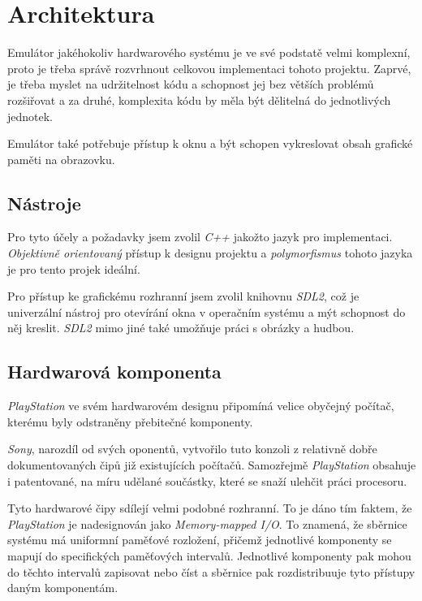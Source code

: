 \chapter{Architektura}

Emulátor jakéhokoliv hardwarového systému je ve své podstatě velmi komplexní,
proto je třeba správě rozvrhnout celkovou implementaci tohoto projektu. 
Zaprvé, je třeba myslet na udržitelnost kódu a schopnost jej bez větších problémů rozšiřovat a
za druhé, komplexita kódu by měla být dělitelná do jednotlivých jednotek.

Emulátor také potřebuje přístup k oknu a být schopen vykreslovat obsah grafické paměti
na obrazovku.

\section{Nástroje}

Pro tyto účely a požadavky jsem zvolil \textit{C++} jakožto jazyk pro implementaci.
\textit{Objektivně orientovaný} přístup k designu projektu a \textit{polymorfismus} tohoto jazyka
je pro tento projek ideální.

Pro přístup ke grafickému rozhranní jsem zvolil knihovnu \textit{SDL2}, což je univerzální
nástroj pro otevírání okna v operačním systému a mýt schopnost do něj kreslit.
\textit{SDL2} mimo jiné také umožňuje práci s obrázky a hudbou.

\section{Hardwarová komponenta}

\textit{PlayStation} ve svém hardwarovém designu připomíná velice obyčejný počítač, kterému byly
odstraněny přebitečné komponenty.

\textit{Sony}, narozdíl od svých oponentů, vytvořilo tuto konzoli z relativně dobře 
dokumentovaných čipů již existujících počítačů. Samozřejmě \textit{PlayStation} obsahuje i
patentované, na míru udělané součástky, které se snaží ulehčit práci procesoru.

Tyto hardwarové čipy sdílejí velmi podobné rozhranní. To je dáno tím faktem, že 
\textit{PlayStation} je nadesignován jako \textit{Memory-mapped I/O}. To znamená, že
sběrnice systému má uniformní paměťové rozložení, přičemž jednotlivé komponenty se mapují
do specifických paměťových intervalů. Jednotlivé komponenty pak mohou do těchto intervalů zapisovat nebo číst
a sběrnice pak rozdistribuuje tyto přístupy daným komponentám.

